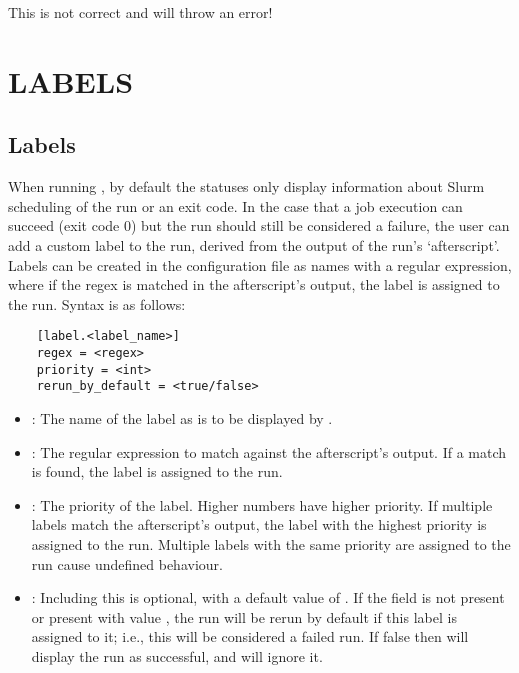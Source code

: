 \documentclass[a4paper,english]{article}
\begin{document}
\begin{adjustwidth}{18pt}{0pt}
        This is not correct and  will throw an error!


  \section{LABELS}
  \subsection{Labels}
  When running  , by default the statuses only display information
  about Slurm scheduling of the run or an exit code.
  In the case that a job execution can succeed (exit code 0) but the run should still
  be considered a failure, the user can add a custom label to the run, derived from
  the output of the run's `afterscript'.
  Labels can be created in the configuration file as names with a regular expression,
  where if the regex is matched in the afterscript's output, the label is assigned to the run.
  Syntax is as follows:

  \begin{verbatim}
    [label.<label_name>]
    regex = <regex>
    priority = <int>
    rerun_by_default = <true/false>
  \end{verbatim}

  \begin{itemize}
      \item {}: The name of the label as is to be displayed by  .
      \item {}: The regular expression to match against the afterscript's output.
      If a match is found, the label is assigned to the run.
      \item {}: The priority of the label.
      Higher numbers have higher priority.
      If multiple labels match the afterscript's output, the label with the highest priority is assigned to the run.
      Multiple labels with the same priority are assigned to the run cause undefined behaviour.
      \item {}: Including this is optional, with a default value of .
      If the field is not present or present with value , the run will be rerun by default if
      this label is assigned to it; i.e., this will be considered a failed run.
      If false then   will display the run as successful, and   will ignore it.
  \end{itemize}


\end{adjustwidth}
\end{document}
